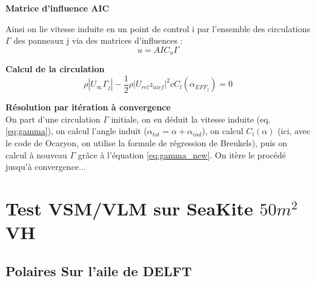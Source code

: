 \documentclass[conference]{IEEEtran}
\begin{document}
\textbf{Matrice d'influence AIC}

Ainsi on lie vitesse induite en un point de control i par l'ensemble des circulations $\Gamma$ des panneaux j via des matrices d'influences : 
\begin{equation}
    u = AIC_u \Gamma
    \label{eq:gamma}
\end{equation}

\textbf{Calcul de la circulation}
\begin{equation}
    \rho |U_{\infty} \Gamma_j| - \frac{1}{2} \rho |U_{rel} z_{airf}|^2 c C_l(\alpha_{EFF_j}) = 0
    \label{eq:gamma_new}
\end{equation}

\textbf{Résolution par itération à convergence}\\
On part d'une circulation $\Gamma$ initiale, on en déduit la vitesse induite (eq. \ref{eq:gamma}), on calcul l'angle induit ($\alpha_{tot} = \alpha + \alpha_{ind}$), on calcul $C_l(\alpha)$ (ici, avec le code de Ocaryon, on utilise la formule de régression de Breukels), puis on calcul à nouveau $\Gamma$ grâce à l'équation \ref{eq:gamma_new}. On itère le procédé jusqu'à convergence...


\IEEEpeerreviewmaketitle
\section{Test VSM/VLM sur SeaKite $50m^2$ VH}

\subsection{Polaires Sur l'aile de DELFT} 
\end{document}
